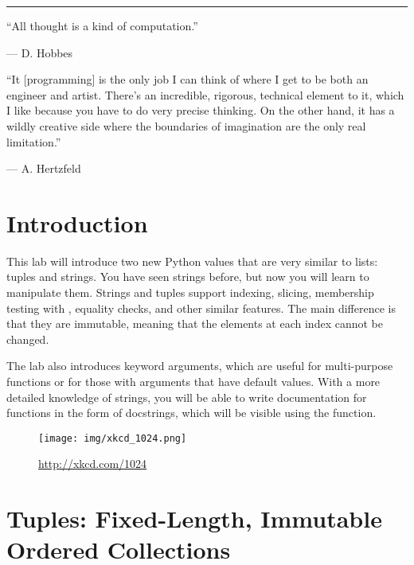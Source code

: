\documentclass[11pt]{cselabheader}
\title{\thetitle}
\author{\theauthor}
\date{NMT Department of Computer Science and Engineering}
\begin{document}
\maketitle
\hrule

\begin{multicols}{2}
``All thought is a kind of computation.''
\begin{flushright}
--- D. Hobbes
\end{flushright}

``It [programming] is the only job I can think of where I get to be both an
engineer and artist. There's an incredible, rigorous, technical element to it,
which I like because you have to do very precise thinking. On the other hand, it
has a wildly creative side where the boundaries of imagination are the only real
limitation.''
\begin{flushright}
--- A. Hertzfeld
\end{flushright}

\section*{Introduction}
This lab will introduce two new Python values that are very similar to
lists: tuples and strings. You have seen strings before, but now you
will learn to manipulate them. Strings and tuples support indexing,
slicing, membership testing with , equality checks,
and other similar features. The main difference is that they are
immutable, meaning that the elements at each index cannot be changed.

The lab also introduces keyword arguments, which are useful for multi-purpose
functions or for those with arguments that have default values. With a
more detailed knowledge of strings, you will be able to write documentation
for functions in the form of docstrings, which will be visible using the
 function.

\begin{figure}[H]
  \centering
  \texttt{[image: img/xkcd\_1024.png]}
  \caption{\url{http://xkcd.com/1024}}
\end{figure}
\end{multicols}

\tableofcontents

\newpage
{}

\section{Tuples: Fixed-Length, Immutable Ordered Collections}
\end{document}
